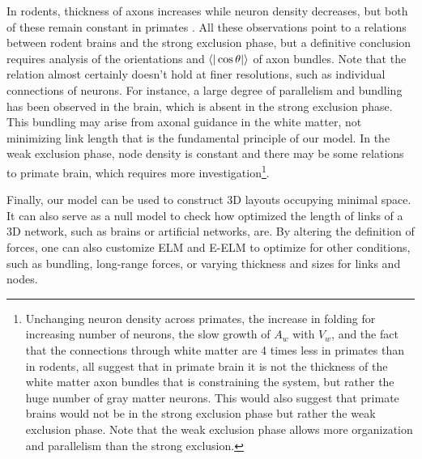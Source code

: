 \documentclass[nofootinbib,preprint,floatfix,endfloats]{revtex4} %
\begin{document}
In rodents, thickness of axons increases while neuron density decreases, but both of these remain constant in primates \cite{herculano2012remarkable}. 
All these observations point to a relations between rodent brains and the strong exclusion phase, but a definitive conclusion requires analysis of the orientations and $\be{|\cos\theta|}$ of axon bundles.%
Note that the relation almost certainly doesn't hold at finer resolutions, such as individual connections of neurons. 
For instance, a large degree of parallelism and bundling has been observed in the brain\cite{le2001diffusion,assaf2008diffusion}, which is absent in the strong exclusion phase. This bundling may arise from axonal guidance in the white matter, not minimizing link length that is the fundamental principle of our model.
In the weak exclusion phase, node density is constant and there may be some relations to primate brain, which requires more investigation\footnote{
Unchanging neuron density across primates, the increase in folding for increasing number of neurons, the slow growth of $A_w$ with $V_w$, and the fact that the connections through white matter are 4 times less in primates than in rodents\cite{herculano2012remarkable}, all suggest that in primate brain it is not the thickness of the white matter axon bundles that is constraining the system, but rather the huge number of gray matter neurons. 
This would also suggest that primate brains would not be in the strong exclusion phase but rather the weak exclusion phase. Note that the weak exclusion phase allows more organization and parallelism than the strong exclusion.}.


Finally, our model can be used to construct 3D layouts occupying minimal space. 
It can also serve  as a null model to check how optimized the length of links of a 3D network, such as brains or artificial networks, are. 
By altering the definition  of forces, one can also customize ELM and E-ELM to optimize for other conditions, such as bundling, long-range forces, or varying thickness and sizes for links and nodes. 



\newpage
\newpage
\end{document}
